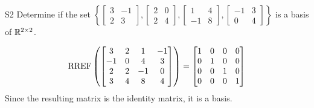 \documentclass{sbgLAquiz}
\begin{document}
\begin{extract}\newpage\end{extract}
\begin{problem}{S2}
  Determine if the set \(\left\{
    \begin{bmatrix} 3 & -1 \\ 2 &3 \end{bmatrix},
    \begin{bmatrix} 2 & 0 \\ 2 & 4\end{bmatrix},
    \begin{bmatrix} 1 & 4 \\ -1 & 8\end{bmatrix},
    \begin{bmatrix} -1 & 3 \\ 0 & 4\end{bmatrix}
  \right\}\) is a basis of $\mathbb{R}^{2\times 2}$.
\end{problem}
\begin{solution}
  \[\operatorname{RREF}\left(
    \begin{bmatrix}
      3 & 2 & 1 & -1\\
      -1 & 0 & 4 & 3\\
      2 & 2 & -1 & 0\\
      3 & 4 & 8 & 4\\
    \end{bmatrix} \right)= \begin{bmatrix}
      1 & 0 & 0 & 0 \\
      0 & 1 & 0 & 0 \\
      0 & 0 & 1 & 0 \\
      0 & 0 & 0 & 1
    \end{bmatrix}
  \]
Since the resulting matrix is the identity matrix, it is a basis.
\end{solution}
\end{document}
